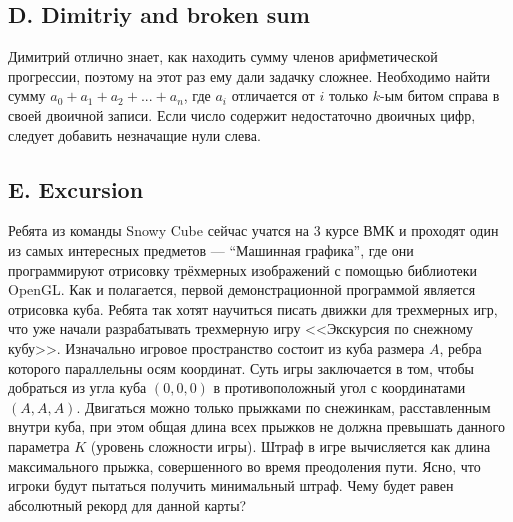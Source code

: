 \subsection*{D. Dimitriy and broken sum}

Димитрий отлично знает, как находить сумму членов арифметической прогрессии, поэтому на этот раз ему дали задачку сложнее.
Необходимо найти сумму $a_0 + a_1 + a_2 + ... + a_n$, где $a_i$ отличается от $i$ только $k$-ым битом справа в своей двоичной записи. Если число содержит недостаточно двоичных цифр, следует добавить незначащие нули слева.







\subsection*{E. Excursion}

Ребята из команды Snowy Cube сейчас учатся на 3 курсе ВМК и проходят один из самых интересных предметов --- “Машинная графика”, где они программируют отрисовку трёхмерных изображений с помощью библиотеки OpenGL. Как и полагается, первой демонстрационной программой является отрисовка куба. Ребята так хотят научиться писать движки для трехмерных игр, что уже начали разрабатывать трехмерную игру <<Экскурсия по снежному кубу>>. Изначально игровое пространство состоит из куба размера $A$, ребра которого параллельны осям координат. Суть игры заключается в том, чтобы добраться из угла куба $(0, 0, 0)$ в противоположный угол с координатами $(A, A, A)$. Двигаться можно только прыжками по снежинкам, расставленным внутри куба, при этом общая длина всех прыжков не должна превышать данного параметра $K$ (уровень сложности игры). Штраф в игре вычисляется как длина максимального прыжка, совершенного во время преодоления пути. Ясно, что игроки будут пытаться получить минимальный штраф. Чему будет равен абсолютный рекорд для данной карты? 


